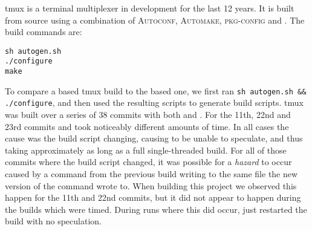 tmux is a terminal multiplexer in development for the last 12 years.  It is built from source using a combination of \textsc{Autoconf}, \textsc{Automake}, \textsc{pkg-config} and \Make.  The build commands are:

\begin{verbatim}
sh autogen.sh
./configure
make
\end{verbatim}

To compare a \Rattle based tmux build to the \Make based one, we first ran \texttt{sh autogen.sh \&\& ./configure}, and then used the resulting \Make scripts to generate \Rattle build scripts. tmux was built over a series of 38 commits with both \Make and \Rattle. For the 11th, 22nd and 23rd commits \Rattle and \Make took noticeably different amounts of time. In all cases the cause was the build script changing, causing \Rattle to be unable to speculate, and thus taking approximately as long as a full single-threaded build.  For all of those commits where the build script changed, it was possible for a \emph{hazard} to occur caused by a command from the previous build writing to the same file the new version of the command wrote to.  When building this project we observed this happen for the 11th and 22nd commits, but it did not appear to happen during the builds which were timed.  During runs where this did occur, \Rattle just restarted the build with no speculation.















